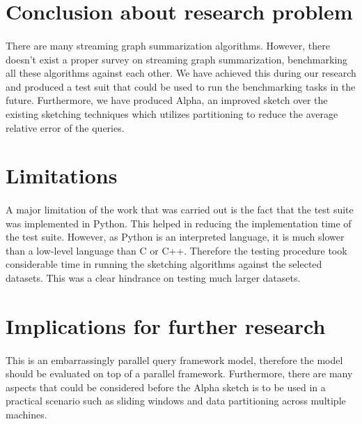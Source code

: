 \section{Conclusion about research problem}
\label{section:conclusion_rp}

\paragraph{}
There are many streaming graph summarization algorithms. However, there doesn’t exist a proper survey on streaming graph summarization, benchmarking all these algorithms against each other. We have achieved this during our research and produced a test suit that could be used to run the benchmarking tasks in the future. Furthermore, we have produced Alpha, an improved sketch over the existing sketching techniques which utilizes partitioning to reduce the average relative error of the queries.

\section{Limitations}
\label{section:conclusion_limitations}

\paragraph{}
A major limitation of the work that was carried out is the fact that the test suite was implemented in Python. This helped in reducing the implementation time of the test suite. However, as Python is an interpreted language, it is much slower than a low-level language than C or C++. Therefore the testing procedure took considerable time in running the sketching algorithms against the selected datasets. This was a clear hindrance on testing much larger datasets.

\section{Implications for further research}
\label{section:conclusion_future}

\paragraph{}
This is an embarrassingly parallel query framework model, therefore the model should be evaluated on top of a parallel framework. Furthermore, there are many aspects that could be considered before the Alpha sketch is to be used in a practical scenario such as sliding windows and data partitioning across multiple machines.